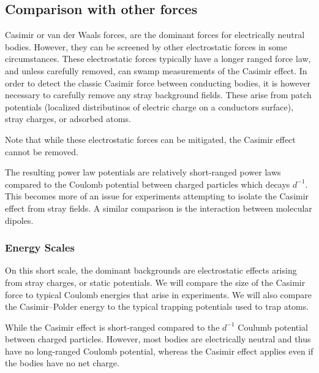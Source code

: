 \subsection{Comparison with other forces}

Casimir or van der Waals forces, are the dominant forces for electrically neutral bodies.  
However, they can be screened by other electrostatic forces in some circumstances.  These electrostatic
forces typically have a longer ranged force law, and unless carefully removed, can swamp measurements 
of the Casimir effect. 
In order to detect the classic Casimir force between conducting bodies, it is however necessary to carefully 
remove any stray background fields.  These arise from patch potentials (localized distributinos of electric charge
on a conductors surface), stray charges, or adsorbed atoms.  

Note that while these electrostatic forces can be mitigated, the Casimir effect cannot be removed.  

The resulting power law potentials are relatively short-ranged power laws compared to the Coulomb potential 
between charged particles which decays $d^{-1}$. 
This becomes more of an issue for experiments attempting to isolate the Casimir effect from stray
fields.  A similar comparison is the interaction between molecular dipoles.  

\subsubsection{Energy Scales}

On this short scale, the dominant backgrounds are electrostatic effects arising from stray charges,
or static potentials.
We will compare the size of the Casimir force to typical Coulomb energies that arise in experiments.
We will also compare the Casimir--Polder energy to the typical trapping potentials used to trap atoms.
  

While the Casimir effect is short-ranged compared to the $d^{-1}$ Coulumb potential between charged particles.
However, most bodies are electrically neutral and thus have no long-ranged Coulomb potential, whereas
the Casimir effect applies even if the bodies have no net charge.  


